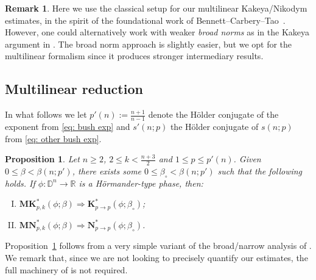 \documentclass[reqno]{amsart}
\numberwithin{equation}{section}
\newcommand{\D}{\mathbb{D}}
\newcommand{\R}{\mathbb{R}}
\newcommand{\bK}{\mathbf{K}}
\newcommand{\bM}{\mathbf{M}}
\newcommand{\bN}{\mathbf{N}}
\theoremstyle{plain}
\newtheorem{proposition}[theorem]{Proposition}
\theoremstyle{definition}
\newtheorem{remark}[theorem]{Remark}
\begin{document}
\begin{remark} Here we use the classical setup for our multilinear Kakeya/Nikodym estimates, in the spirit of the foundational work of Bennett--Carbery--Tao~\cite{BCT2006}. However, one could alternatively work with weaker \textit{broad norms} as in the Kakeya argument in \cite{HRZ2022}. The broad norm approach is slightly easier, but we opt for the multilinear formalism since it produces stronger intermediary results. 
\end{remark}





\subsection{Multilinear reduction} In what follows we let $p'(n) := \frac{n+1}{n-1}$ denote the H\"older conjugate of the exponent from \eqref{eq: bush exp} and $s'(n;p)$ the H\"older conjugate of $s(n;p)$ from \eqref{eq: other bush exp}.

\begin{proposition}\label{prop: multilinear red} Let $n \geq 2$, $2 \leq k < \frac{n+3}{2}$ and $1 \leq p \leq p'(n)$. Given $0 \leq \beta < \beta(n;p')$, there exists some $0 \leq \beta_{\circ} < \beta(n;p')$ such that the following holds. If $\phi \colon \D^n \to \R$ is a H\"ormander-type phase, then:
\begin{enumerate}[I)]
    \item $\bM\bK_{p, k}^*(\phi; \beta) \Rightarrow \bK_{p \to p}^*(\phi; \beta_{\circ})$;
    \item $\bM\bN_{p, k}^*(\phi; \beta) \Rightarrow \bN_{p \to p}^*(\phi; \beta_{\circ})$.
\end{enumerate}
\end{proposition}

Proposition~\ref{prop: multilinear red} follows from a very simple variant  of the broad/narrow analysis of \cite{BG2011}. We remark that, since we are not looking to precisely quantify our estimates, the full machinery of \cite{BG2011} is not required. 
\end{document}
